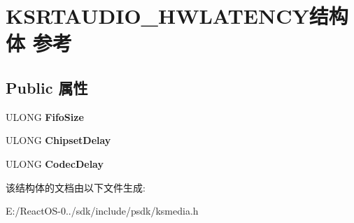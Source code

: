 \hypertarget{struct_k_s_r_t_a_u_d_i_o___h_w_l_a_t_e_n_c_y}{}\section{K\+S\+R\+T\+A\+U\+D\+I\+O\+\_\+\+H\+W\+L\+A\+T\+E\+N\+C\+Y结构体 参考}
\label{struct_k_s_r_t_a_u_d_i_o___h_w_l_a_t_e_n_c_y}
\subsection*{Public 属性}
\begin{DoxyCompactItemize}
\item 
\mbox{\label{struct_k_s_r_t_a_u_d_i_o___h_w_l_a_t_e_n_c_y_a01cbb7f2c8e1ce0634a0bb6ea3676fd2}} 
U\+L\+O\+NG {\bfseries Fifo\+Size}
\item 
\mbox{\label{struct_k_s_r_t_a_u_d_i_o___h_w_l_a_t_e_n_c_y_a156b7a78feb32d965e198aec47a3f7f3}} 
U\+L\+O\+NG {\bfseries Chipset\+Delay}
\item 
\mbox{\label{struct_k_s_r_t_a_u_d_i_o___h_w_l_a_t_e_n_c_y_ab639001744122762150ce8a34ea1936e}} 
U\+L\+O\+NG {\bfseries Codec\+Delay}
\end{DoxyCompactItemize}


该结构体的文档由以下文件生成\+:\begin{DoxyCompactItemize}
\item 
E\+:/\+React\+O\+S-\/0../sdk/include/psdk/ksmedia.\+h\end{DoxyCompactItemize}
